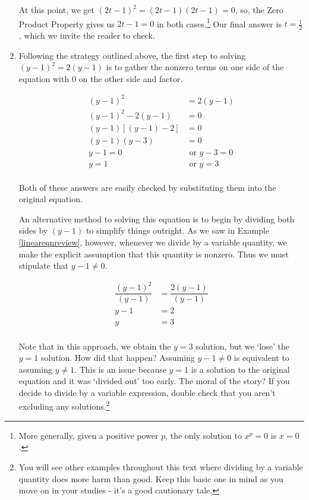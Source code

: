 \begin{ex}
\begin{enumerate}
At this point, we get $(2t-1)^2 = (2t-1)(2t-1) = 0$, so, the Zero Product Property gives us $2t-1 =0$ in both cases.\footnote{More generally, given a positive power $p$,  the only solution to $x^p = 0$ is $x = 0$.}  Our final answer is $t = \frac{1}{2}$, which we invite the reader to check.

\item  Following the strategy outlined above, the first step to solving $(y-1)^2 = 2(y-1)$ is to gather the nonzero terms on one side of the equation with $0$ on the other side and factor.

\begin{align*}
(y-1)^2 & = 2(y-1) \\
(y-1)^2 - 2(y-1) & = 0 \tag{Subtract $2(y-1)$} \\
(y-1)[(y-1) - 2] & = 0 \tag{Factor out G.C.F.} \\
(y-1)(y-3) & = 0 \tag{Simplify} \\
y-1 = 0 & \text{ or } y - 3 = 0 \\
y = 1 & \text{ or } y = 3 \\
\end{align*}

Both of these answers are easily checked by substituting them into the original equation.  

An alternative method to solving this equation is to begin by dividing both sides by $(y-1)$ to simplify things outright.  As we saw in Example \ref{lineareqnreview}, however, whenever we divide by a variable quantity, we make the explicit assumption that this quantity is nonzero.  Thus we must stipulate that $y - 1 \neq 0$.

\begin{align*}
\dfrac{(y-1)^2}{(y-1)} & = \dfrac{2(y-1)}{(y-1)} \tag{Divide by $y-1$. This assumes $y-1 \neq 0$}\\
y - 1 & = 2 \\
y & = 3 \\
\end{align*}

Note that in this approach, we obtain the $y=3$ solution, but we `lose' the $y = 1$ solution. How did that happen?  Assuming $y - 1 \neq 0$ is equivalent to assuming $y \neq 1$.  This is an issue because $y = 1$ is a solution to the original equation and it was `divided out' too early.  The moral of the story?  If you decide to divide by a variable expression, double check that you aren't excluding any solutions.\footnote{You will see other examples throughout this text where dividing by a variable quantity does more harm than good.  Keep this basic one in mind as you move on in your studies - it's a good cautionary tale.}


\end{enumerate}
\end{ex}
